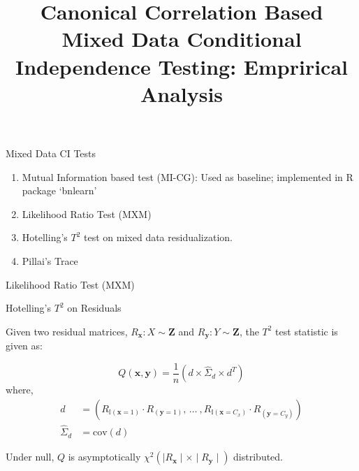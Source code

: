 \documentclass{beamer}
\begin{document}
\title[]{Canonical Correlation Based Mixed Data Conditional Independence Testing: Emprirical Analysis}
\author{}
\date{}

\maketitle

\begin{frame}{Mixed Data CI Tests}
	\begin{enumerate}
		\item Mutual Information based test (MI-CG): Used as baseline; implemented in R package `bnlearn'
		\item Likelihood Ratio Test (MXM)
		\item Hotelling's $T^2$ test on mixed data residualization.
		\item Pillai's Trace
	\end{enumerate}
\end{frame}

\begin{frame}{Likelihood Ratio Test (MXM)}
\end{frame}

\begin{frame}{Hotelling's $ T^2 $ on Residuals}

Given two residual matrices, $ R_{\bm{x}}: X \sim \bm{Z} $ and $ R_{\bm{y}}: Y \sim \bm{Z} $, the $ T^2 $ test statistic is given as:

\begin{equation}
	Q(\mathbf{x}, \mathbf{y}) = \frac{1}{n} \left( d \times \hat{\Sigma}_d \times d^T \right)
\end{equation}
where,
\begin{equation}
	\begin{split}
		d &= (R_{\mathbb{I}(\mathbf{x}=1)} \cdot R_{(\mathbf{y}=1)}, \, \ldots \ , R_{\mathbb{I}(\mathbf{x}=C_x)} \cdot R_{(\mathbf{y}=C_y)} ) \\
		\hat{\Sigma}_d &= \textrm{cov}(d)
	\end{split}
\end{equation}


Under null, $ Q $ is asymptotically $ \chi^2 (\mid R_\mathbf{x} \mid \times \mid R_\mathbf{y} \mid) $ distributed.

\end{frame}
\end{document}
